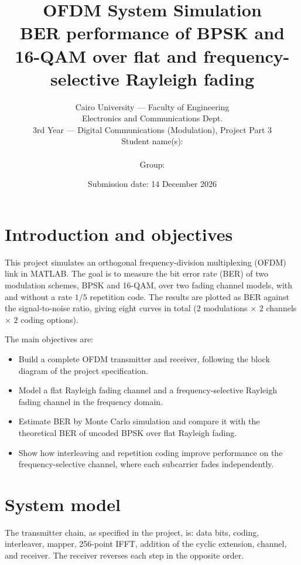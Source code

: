 \documentclass[11pt,a4paper]{article}
\title{\textbf{OFDM System Simulation}\\[0.4em]
\large BER performance of BPSK and 16-QAM over flat and frequency-selective Rayleigh fading}
\author{Cairo University --- Faculty of Engineering\\Electronics and Communications Dept.\\3rd Year --- Digital Communications (Modulation), Project Part 3\\[1em]Student name(s): \rule{5cm}{0.4pt} \quad Group: \rule{2cm}{0.4pt}}
\date{Submission date: 14 December 2026}
\begin{document}
\maketitle

\section{Introduction and objectives}

This project simulates an orthogonal frequency-division multiplexing (OFDM) link in MATLAB. The goal is to measure the bit error rate (BER) of two modulation schemes, BPSK and 16-QAM, over two fading channel models, with and without a rate $1/5$ repetition code. The results are plotted as BER against the signal-to-noise ratio, giving eight curves in total ($2$ modulations $\times$ $2$ channels $\times$ $2$ coding options).

The main objectives are:
\begin{itemize}[leftmargin=*]
  \item Build a complete OFDM transmitter and receiver, following the block diagram of the project specification.
  \item Model a flat Rayleigh fading channel and a frequency-selective Rayleigh fading channel in the frequency domain.
  \item Estimate BER by Monte Carlo simulation and compare it with the theoretical BER of uncoded BPSK over flat Rayleigh fading.
  \item Show how interleaving and repetition coding improve performance on the frequency-selective channel, where each subcarrier fades independently.
\end{itemize}

\section{System model}

The transmitter chain, as specified in the project, is: data bits, coding, interleaver, mapper, 256-point IFFT, addition of the cyclic extension, channel, and receiver. The receiver reverses each step in the opposite order.
\end{document}
